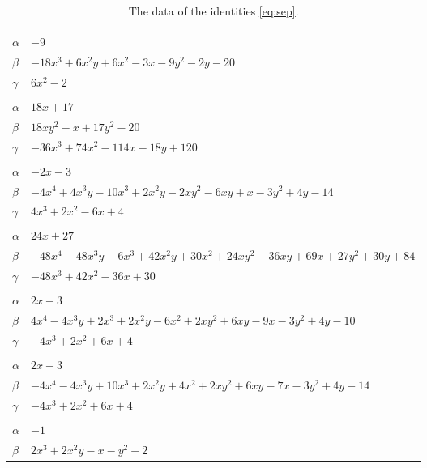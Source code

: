 \documentclass[11pt]{article}
\begin{document}
\begingroup\footnotesize
\setlength{\LTcapwidth}{\textwidth}
\begin{longtable}{@{}ll@{}}
\caption{The data of the identities \eqref{eq:sep}.}\label{tab:sep}\\
\hline\endfirsthead\hline\endhead\hline\endfoot
\multicolumn{2}{@{}l}{$\{i,j\}=\{0,1\}$, $k_{ij}=7$}\\
$\alpha$ & $-9$\\
$\beta$ & $-18x^{3}+6x^{2}y+6x^{2}-3x-9y^{2}-2y-20$\\
$\gamma$ & $6x^{2}-2$\\
\addlinespace[3pt]
\multicolumn{2}{@{}l}{$\{i,j\}=\{0,2\}$, $k_{ij}=7^{3}$}\\
$\alpha$ & $18x+17$\\
$\beta$ & $18xy^{2}-x+17y^{2}-20$\\
$\gamma$ & $-36x^{3}+74x^{2}-114x-18y+120$\\
\addlinespace[3pt]
\multicolumn{2}{@{}l}{$\{i,j\}=\{0,3\}$, $k_{ij}=7$}\\
$\alpha$ & $-2x-3$\\
$\beta$ & $-4x^{4}+4x^{3}y-10x^{3}+2x^{2}y-2xy^{2}-6xy+x-3y^{2}+4y-14$\\
$\gamma$ & $4x^{3}+2x^{2}-6x+4$\\
\addlinespace[3pt]
\multicolumn{2}{@{}l}{$\{i,j\}=\{0,4\}$, $k_{ij}=3$}\\
$\alpha$ & $24x+27$\\
$\beta$ & $-48x^{4}-48x^{3}y-6x^{3}+42x^{2}y+30x^{2}+24xy^{2}-36xy+69x+27y^{2}+30y+84$\\
$\gamma$ & $-48x^{3}+42x^{2}-36x+30$\\
\addlinespace[3pt]
\multicolumn{2}{@{}l}{$\{i,j\}=\{0,5\}$, $k_{ij}=7$}\\
$\alpha$ & $2x-3$\\
$\beta$ & $4x^{4}-4x^{3}y+2x^{3}+2x^{2}y-6x^{2}+2xy^{2}+6xy-9x-3y^{2}+4y-10$\\
$\gamma$ & $-4x^{3}+2x^{2}+6x+4$\\
\addlinespace[3pt]
\multicolumn{2}{@{}l}{$\{i,j\}=\{0,6\}$, $k_{ij}=7$}\\
$\alpha$ & $2x-3$\\
$\beta$ & $-4x^{4}-4x^{3}y+10x^{3}+2x^{2}y+4x^{2}+2xy^{2}+6xy-7x-3y^{2}+4y-14$\\
$\gamma$ & $-4x^{3}+2x^{2}+6x+4$\\
\addlinespace[3pt]
\multicolumn{2}{@{}l}{$\{i,j\}=\{0,13\}$, $k_{ij}=1$}\\
$\alpha$ & $-1$\\
$\beta$ & $2x^{3}+2x^{2}y-x-y^{2}-2$\\

\end{longtable}
\end{document}
